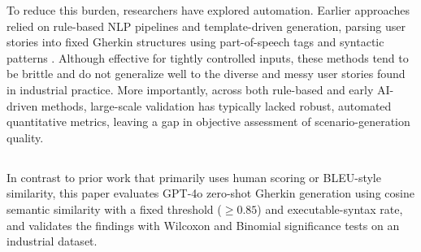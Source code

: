To reduce this burden, researchers have explored automation. Earlier approaches relied on rule-based NLP pipelines and template-driven generation, parsing user stories into fixed Gherkin structures using part-of-speech tags and syntactic patterns \cite{wang2021automated, alfadel2021empirical}. Although effective for tightly controlled inputs, these methods tend to be brittle and do not generalize well to the diverse and messy user stories found in industrial practice. More importantly, across both rule-based and early AI-driven methods, large-scale validation has typically lacked robust, automated quantitative metrics, leaving a gap in objective assessment of scenario-generation quality.

\subsection*{}

In contrast to prior work that primarily uses human scoring or BLEU-style similarity, this paper evaluates GPT-4o zero-shot Gherkin generation using cosine semantic similarity with a fixed threshold ($\geq 0.85$) and executable-syntax rate, and validates the findings with Wilcoxon and Binomial significance tests on an industrial dataset.